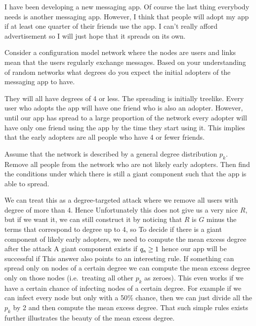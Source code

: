 
I have been developing a new messaging app. Of course the last thing everybody needs is another messaging app. However, I think that people will adopt my app if at least one quarter of their friends use the app. I can't really afford advertisement so I will just hope that it spreads on its own. 

\subquestion 
Consider a configuration model network where the nodes are users and links mean that the users regularly exchange messages. Based on your understanding of random networks what degrees do you expect the initial adopters of the messaging app to have. 

\solution 
They will all have degrees of 4 or less. The spreading is initially treelike. Every user who adopts the app will have one friend who is also an adopter. However, until our app has spread to a large proportion of the network every adopter will have only one friend using the app by the time they start using it. This implies that the early adopters are all people who have 4 or fewer friends. 

\subquestion
Assume that the network is described by a general degree distribution $p_k$.
Remove all people from the network who are not likely early adopters. Then find the conditions under which there is still a giant component such that the app is able to spread. 

\solution We can treat this as a degree-targeted attack where we remove all users with degree of more than 4. Hence 
Unfortunately this does not give us a very nice $R$, but if we want it, we can still construct it by noticing that $R$ is $G$ minus the terms that correspond to degree up to 4, so 
To decide if there is a giant component of likely early adopters, we need to compute the mean excess degree after the attack
A giant component exists if $q_{\rm a}\geq 1$ hence our app will be successful if 
This answer also points to an interesting rule. If something can spread only on nodes of a certain degree we can compute the mean excess degree only on those nodes (i.e.~treating all other $p_k$ as zeroes). This even works if we have a certain chance of infecting nodes of a certain degree. For example if we can infect every node but only with a 50\% chance, then we can just divide all the $p_k$ by 2 and then compute the mean excess degree. That such simple rules exists further illustrates the beauty of the mean excess degree. 

